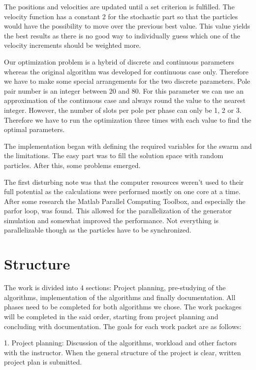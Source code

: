 \documentclass[twoside]{article}
\begin{document}
\begin{multicols}{2}
The positions and velocities are updated until a set criterion is fulfilled. The velocity function has a constant 2 for the stochastic part so that the particles would have the possibility to move over the previous best value. This value yields the best results as there is no good way to individually guess which one of the velocity increments should be weighted more. \cite{pso} 

Our optimization problem is a hybrid of discrete and continuous parameters whereas the original algorithm was developed for continuous case only. Therefore we have to make some special arrangements for the two discrete parameters. Pole pair number is an integer between 20 and 80. For this parameter we can use an approximation of the continuous case and always round the value to the nearest integer. However, the number of slots per pole per phase can only be 1, 2 or 3. Therefore we have to run the optimization three times with each value to find the optimal parameters.

The implementation began with defining the required variables for the swarm and the limitations. The easy part was to fill the solution space with random particles. After this, some problems emerged.

The first disturbing note was that the computer resources weren't used to their full potential as the calculations were performed mostly on one core at a time. After some research the Matlab Parallel Computing Toolbox, and especially the parfor loop, was found. This allowed for the parallelization of the generator simulation and somewhat improved the performance. Not everything is parallelizable though as the particles have to be synchronized. 



\section{Structure}

The work is divided into 4 sections: Project planning, pre-studying of the algorithms, implementation of the algorithms and finally documentation. All phases need to be completed for both algorithms we chose. The work packages will be completed in the said order, starting from project planning and concluding with documentation. The goals for each work packet are as follows:

1. Project planning:
Discussion of the algorithms, workload and other factors with the instructor. When the general structure of the project is clear, written project plan is submitted.


\end{multicols}
\end{document}
